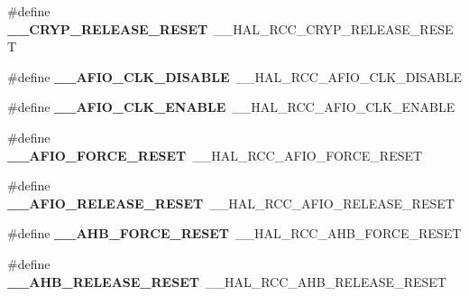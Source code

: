 \begin{DoxyCompactItemize}
\item 
\hypertarget{group___h_a_l___r_c_c___aliased_ga0bfbfb4f9ecc493c450fb949d53c304d}{\#define {\bfseries \-\_\-\-\_\-\-C\-R\-Y\-P\-\_\-\-R\-E\-L\-E\-A\-S\-E\-\_\-\-R\-E\-S\-E\-T}~\-\_\-\-\_\-\-H\-A\-L\-\_\-\-R\-C\-C\-\_\-\-C\-R\-Y\-P\-\_\-\-R\-E\-L\-E\-A\-S\-E\-\_\-\-R\-E\-S\-E\-T}\label{group___h_a_l___r_c_c___aliased_ga0bfbfb4f9ecc493c450fb949d53c304d}

\item 
\hypertarget{group___h_a_l___r_c_c___aliased_ga35e6ac63d013180c4eb9505f3d2b6bc0}{\#define {\bfseries \-\_\-\-\_\-\-A\-F\-I\-O\-\_\-\-C\-L\-K\-\_\-\-D\-I\-S\-A\-B\-L\-E}~\-\_\-\-\_\-\-H\-A\-L\-\_\-\-R\-C\-C\-\_\-\-A\-F\-I\-O\-\_\-\-C\-L\-K\-\_\-\-D\-I\-S\-A\-B\-L\-E}\label{group___h_a_l___r_c_c___aliased_ga35e6ac63d013180c4eb9505f3d2b6bc0}

\item 
\hypertarget{group___h_a_l___r_c_c___aliased_gaf4c3e6fd0199c64f366becccf3e7a3ed}{\#define {\bfseries \-\_\-\-\_\-\-A\-F\-I\-O\-\_\-\-C\-L\-K\-\_\-\-E\-N\-A\-B\-L\-E}~\-\_\-\-\_\-\-H\-A\-L\-\_\-\-R\-C\-C\-\_\-\-A\-F\-I\-O\-\_\-\-C\-L\-K\-\_\-\-E\-N\-A\-B\-L\-E}\label{group___h_a_l___r_c_c___aliased_gaf4c3e6fd0199c64f366becccf3e7a3ed}

\item 
\hypertarget{group___h_a_l___r_c_c___aliased_ga841e59e167589985ea9819b41bbf6bf3}{\#define {\bfseries \-\_\-\-\_\-\-A\-F\-I\-O\-\_\-\-F\-O\-R\-C\-E\-\_\-\-R\-E\-S\-E\-T}~\-\_\-\-\_\-\-H\-A\-L\-\_\-\-R\-C\-C\-\_\-\-A\-F\-I\-O\-\_\-\-F\-O\-R\-C\-E\-\_\-\-R\-E\-S\-E\-T}\label{group___h_a_l___r_c_c___aliased_ga841e59e167589985ea9819b41bbf6bf3}

\item 
\hypertarget{group___h_a_l___r_c_c___aliased_gaadb5113bd9b830d9b8db0fa5764b23af}{\#define {\bfseries \-\_\-\-\_\-\-A\-F\-I\-O\-\_\-\-R\-E\-L\-E\-A\-S\-E\-\_\-\-R\-E\-S\-E\-T}~\-\_\-\-\_\-\-H\-A\-L\-\_\-\-R\-C\-C\-\_\-\-A\-F\-I\-O\-\_\-\-R\-E\-L\-E\-A\-S\-E\-\_\-\-R\-E\-S\-E\-T}\label{group___h_a_l___r_c_c___aliased_gaadb5113bd9b830d9b8db0fa5764b23af}

\item 
\hypertarget{group___h_a_l___r_c_c___aliased_ga1cc42f2b9cb1a6c13f6d2453f8fd6451}{\#define {\bfseries \-\_\-\-\_\-\-A\-H\-B\-\_\-\-F\-O\-R\-C\-E\-\_\-\-R\-E\-S\-E\-T}~\-\_\-\-\_\-\-H\-A\-L\-\_\-\-R\-C\-C\-\_\-\-A\-H\-B\-\_\-\-F\-O\-R\-C\-E\-\_\-\-R\-E\-S\-E\-T}\label{group___h_a_l___r_c_c___aliased_ga1cc42f2b9cb1a6c13f6d2453f8fd6451}

\item 
\hypertarget{group___h_a_l___r_c_c___aliased_gafd2237a0d990dfe8f203436c0e0315ee}{\#define {\bfseries \-\_\-\-\_\-\-A\-H\-B\-\_\-\-R\-E\-L\-E\-A\-S\-E\-\_\-\-R\-E\-S\-E\-T}~\-\_\-\-\_\-\-H\-A\-L\-\_\-\-R\-C\-C\-\_\-\-A\-H\-B\-\_\-\-R\-E\-L\-E\-A\-S\-E\-\_\-\-R\-E\-S\-E\-T}\label{group___h_a_l___r_c_c___aliased_gafd2237a0d990dfe8f203436c0e0315ee}


\end{DoxyCompactItemize}
